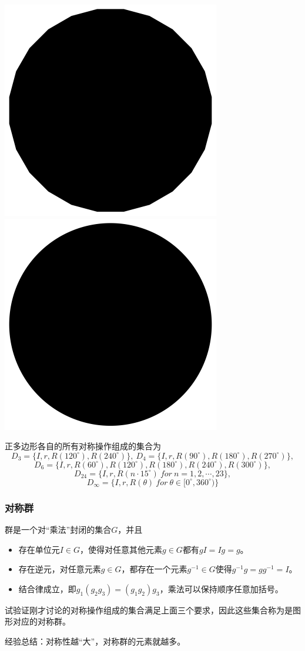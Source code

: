 \documentclass[CJK]{beamer}
\begin{document}
\begin{frame}
\begin{center}
\includegraphics[scale=0.15]{pol24}
\includegraphics[scale=0.15]{cir}
\end{center}
正多边形各自的所有对称操作组成的集合为
$$D_3 = \{I,r,R(120^\circ),R(240^\circ)\},\ D_4 = \{I,r,R(90^\circ),R(180^\circ),R(270^\circ)\},$$
$$D_6 = \{I,r,R(60^\circ),R(120^\circ),R(180^\circ),R(240^\circ),R(300^\circ)\},$$
$$D_{24} = \{I,r,R(n\cdot 15^\circ) \ for \ n=1,2,\cdots,23\},$$
$$D_\infty = \{I,r,R(\theta) \ for \ \theta \in [0^\circ, 360^\circ)\}$$


\ech
\end{frame}

\begin{frame}
\frametitle{\bch 对称群 \ech}
\bch
群是一个对“乘法”封闭的集合$G$，并且
\begin{itemize}
\item 存在单位元$I \in G$，使得对任意其他元素$g \in G$都有$gI = Ig = g$。
\item 存在逆元，对任意元素$g \in G$，都存在一个元素$g^{-1}\in G$使得$g^{-1} g = gg^{-1} = I$。
\item 结合律成立，即$g_1 ( g_2 g_3) = (g_1 g_2) g_3$，乘法可以保持顺序任意加括号。
\end{itemize}
试验证刚才讨论的对称操作组成的集合满足上面三个要求，因此这些集合称为是图形对应的对称群。 
\par
经验总结：对称性越“大”，对称群的元素就越多。

\ech
\end{frame}
\end{document}
